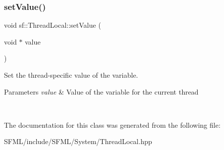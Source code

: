 \subsubsection{\texorpdfstring{setValue()}{setValue()}}
{\footnotesize\ttfamily void sf\+::\+Thread\+Local\+::set\+Value (\begin{DoxyParamCaption}\item[{void $\ast$}]{value }\end{DoxyParamCaption})}



Set the thread-\/specific value of the variable. 


\begin{DoxyParams}{Parameters}
{\em value} & Value of the variable for the current thread \begin{DoxyVerb}\end{DoxyVerb}
 \\
\hline
\end{DoxyParams}


The documentation for this class was generated from the following file\+:\begin{DoxyCompactItemize}
\item 
S\+F\+M\+L/include/\+S\+F\+M\+L/\+System/Thread\+Local.\+hpp\end{DoxyCompactItemize}
